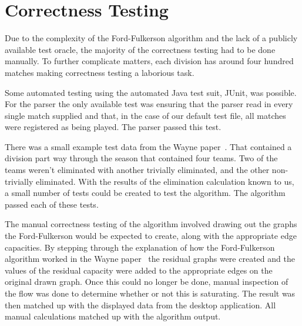 \section{Correctness Testing}

Due to the complexity of the Ford-Fulkerson algorithm and the lack of a
publicly available test oracle, the majority of the correctness testing had to
be done manually. To further complicate matters, each division has around four
hundred matches making correctness testing a laborious task.

Some automated testing using the automated Java test suit, JUnit, was possible.
For the parser the only available test was ensuring that the parser read in
every single match supplied and that, in the case of our default test file,
all matches were registered as being played. The parser passed this test.

There was a small example test data from the Wayne paper~\cite{Wayne}. That
contained a division part way through the season that contained four teams.
Two of the teams weren't eliminated with another trivially eliminated, and the
other non-trivially eliminated. With the results of the elimination calculation
known to us, a small number of tests could be created to test the algorithm.
The algorithm passed each of these tests.

The manual correctness testing of the algorithm involved drawing out the graphs
the Ford-Fulkerson would be expected to create, along with the appropriate
edge capacities. By stepping through the explanation of how the Ford-Fulkerson
algorithm worked in the Wayne paper~\cite{Wayne} the residual graphs were
created and the values of the residual capacity were added to the appropriate
edges on the original drawn graph. Once this could no longer be done, manual
inspection of the flow was done to determine whether or not this is saturating.
The result was then matched up with the displayed data from the desktop
application. All manual calculations matched up with the algorithm output.